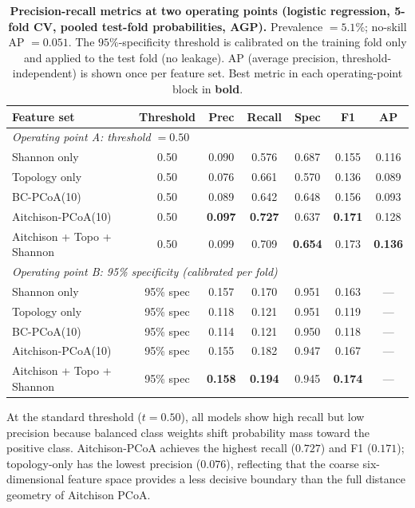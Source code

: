 \begin{table}[H]
\centering
\caption{%
  \textbf{Precision-recall metrics at two operating points (logistic regression,
  5-fold CV, pooled test-fold probabilities, AGP).}
  Prevalence $= 5.1\%$; no-skill AP $= 0.051$.
  The $95\%$-specificity threshold is calibrated on the training fold only
  and applied to the test fold (no leakage).
  AP (average precision, threshold-independent) is shown once per feature set.
  Best metric in each operating-point block in \textbf{bold}.
}
\label{tab:pr_metrics}
\small
\setlength{\tabcolsep}{6pt}
\begin{tabular}{lcccccc}
\toprule
\textbf{Feature set} & \textbf{Threshold} & \textbf{Prec} & \textbf{Recall} & \textbf{Spec} & \textbf{F1} & \textbf{AP} \\
\midrule
\multicolumn{7}{l}{\textit{Operating point A: threshold $= 0.50$}} \\[2pt]
Shannon only                & 0.50 & 0.090 & 0.576 & 0.687 & 0.155 & 0.116 \\
Topology only               & 0.50 & 0.076 & 0.661 & 0.570 & 0.136 & 0.089 \\
BC-PCoA(10)                 & 0.50 & 0.089 & 0.642 & 0.648 & 0.156 & 0.093 \\
Aitchison-PCoA(10)          & 0.50 & \textbf{0.097} & \textbf{0.727} & 0.637 & \textbf{0.171} & 0.128 \\
Aitchison + Topo + Shannon  & 0.50 & 0.099 & 0.709 & \textbf{0.654} & 0.173 & \textbf{0.136} \\
\midrule
\multicolumn{7}{l}{\textit{Operating point B: 95\% specificity (calibrated per fold)}} \\[2pt]
Shannon only                & 95\% spec & 0.157 & 0.170 & 0.951 & 0.163 & ---   \\
Topology only               & 95\% spec & 0.118 & 0.121 & 0.951 & 0.119 & ---   \\
BC-PCoA(10)                 & 95\% spec & 0.114 & 0.121 & 0.950 & 0.118 & ---   \\
Aitchison-PCoA(10)          & 95\% spec & 0.155 & 0.182 & 0.947 & 0.167 & ---   \\
Aitchison + Topo + Shannon  & 95\% spec & \textbf{0.158} & \textbf{0.194} & 0.945 & \textbf{0.174} & --- \\
\bottomrule
\end{tabular}
\end{table}

At the standard threshold ($t = 0.50$), all models show high recall but low
precision because balanced class weights shift probability mass toward the
positive class.
Aitchison-PCoA achieves the highest recall ($0.727$) and F1 ($0.171$);
topology-only has the lowest precision ($0.076$), reflecting that the
coarse six-dimensional feature space provides a less decisive boundary than
the full distance geometry of Aitchison PCoA.

